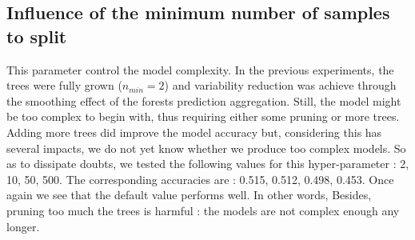 \documentclass[a4paper]{report}
\begin{document}
		\subsection{Influence of the minimum number of samples to split}
		This parameter control the model complexity. In the previous experiments, the trees were fully grown ($n_{min} = 2$) and variability reduction was achieve through the smoothing effect of the forests prediction aggregation. Still, the model might be too complex to begin with, thus requiring either some pruning or more trees. Adding more trees did improve the model accuracy but, considering this has several impacts, we do not yet know whether we produce too complex models. So as to dissipate doubts, we tested the following values for this hyper-parameter : 2, 10, 50, 500. The corresponding accuracies are : 0.515, 0.512, 0.498, 0.453. Once again we see that the default value performs well. In other words, Besides, pruning too much the trees is harmful : the models are not complex enough any longer.
		
\end{document}
